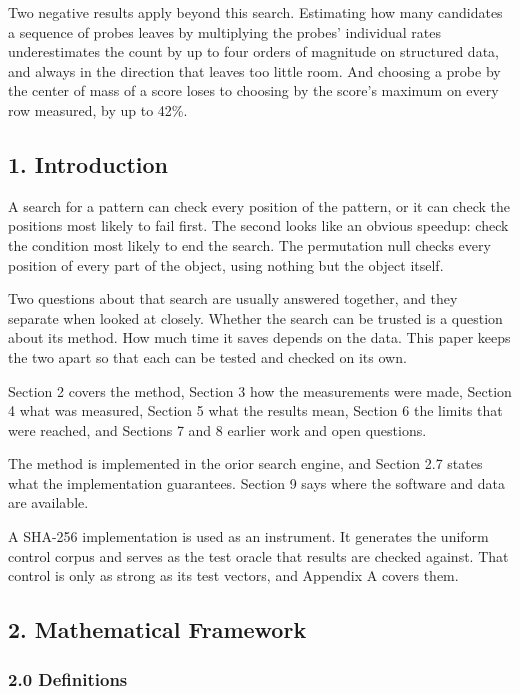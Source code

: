 Two negative results apply beyond this search. Estimating how many candidates a sequence of probes leaves by multiplying the probes' individual rates underestimates the count by up to four orders of magnitude on structured data, and always in the direction that leaves too little room. And choosing a probe by the center of mass of a score loses to choosing by the score's maximum on every row measured, by up to 42\%.

\subsection{1. Introduction}

A search for a pattern can check every position of the pattern, or it can check the positions most
likely to fail first. The second looks like an obvious speedup: check the condition most likely to
end the search. The permutation null checks every position of every part of the object, using
nothing but the object itself.

Two questions about that search are usually answered together, and they separate when looked at
closely. Whether the search can be trusted is a question about its method. How much time it saves
depends on the data. This paper keeps the two apart so that each can be tested and checked on its
own.

Section 2 covers the method, Section 3 how the measurements were made, Section 4 what was
measured, Section 5 what the results mean, Section 6 the limits that were reached, and Sections 7
and 8 earlier work and open questions.

The method is implemented in the orior search engine, and Section 2.7 states what the
implementation guarantees. Section 9 says where the software and data are available.

A SHA-256 implementation is used as an instrument. It generates the uniform control corpus and
serves as the test oracle that results are checked against. That control is only as strong as its
test vectors, and Appendix A covers them.

\subsection{2. Mathematical Framework}

\subsubsection{2.0 Definitions}

